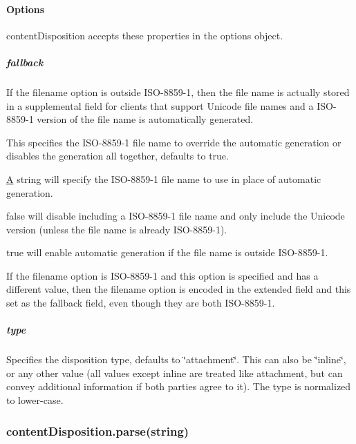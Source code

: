 \paragraph*{Options}

{\ttfamily content\+Disposition} accepts these properties in the options object.

\subparagraph*{fallback}

If the {\ttfamily filename} option is outside I\+S\+O-\/8859-\/1, then the file name is actually stored in a supplemental field for clients that support Unicode file names and a I\+S\+O-\/8859-\/1 version of the file name is automatically generated.

This specifies the I\+S\+O-\/8859-\/1 file name to override the automatic generation or disables the generation all together, defaults to {\ttfamily true}.


\begin{DoxyItemize}
\item \hyperlink{class_a}{A} string will specify the I\+S\+O-\/8859-\/1 file name to use in place of automatic generation.
\item {\ttfamily false} will disable including a I\+S\+O-\/8859-\/1 file name and only include the Unicode version (unless the file name is already I\+S\+O-\/8859-\/1).
\item {\ttfamily true} will enable automatic generation if the file name is outside I\+S\+O-\/8859-\/1.
\end{DoxyItemize}

If the {\ttfamily filename} option is I\+S\+O-\/8859-\/1 and this option is specified and has a different value, then the {\ttfamily filename} option is encoded in the extended field and this set as the fallback field, even though they are both I\+S\+O-\/8859-\/1.

\subparagraph*{type}

Specifies the disposition type, defaults to {\ttfamily \char`\"{}attachment\char`\"{}}. This can also be {\ttfamily \char`\"{}inline\char`\"{}}, or any other value (all values except inline are treated like {\ttfamily attachment}, but can convey additional information if both parties agree to it). The type is normalized to lower-\/case.

\subsubsection*{content\+Disposition.\+parse(string)}




